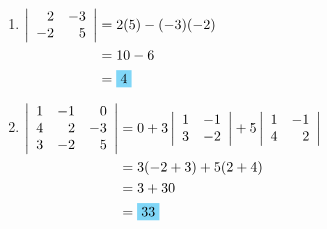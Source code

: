 \begin{enumerate}[leftmargin=2cm,labelsep=.5cm,label=\bfseries\alph*)]
	\item $
	\begin{aligned}[t]
	\left|
		\begin{array}{rr}
		2&-3 \\
		-2&5 \\
		\end{array}
	\right| 
	&= 2(5)-(-3)(-2) \\
	&= 10-6 \\ 
	&= \hlbox{4}
	\end{aligned} $
	\\[1cm]
	
	\item $
	\begin{aligned}[t]
	\left|
		\begin{array}{rrr}
		1&-1&0 \\
		4&2&-3 \\
		3&-2&5 \\
		\end{array}
	\right| 
	&= 0
	+3\left|
		\begin{array}{rr}
		1&-1 \\
		3&-2 \\
		\end{array}
	\right|
	+5\left|
		\begin{array}{rr}
		1&-1 \\
		4&2 \\
		\end{array}
	\right| \\
	&= 3(-2+3)+5(2+4) \\
	&= 3+30 \\
	&= \hlbox{33}
	\end{aligned} $
	\\[1cm]
	

\end{enumerate}
